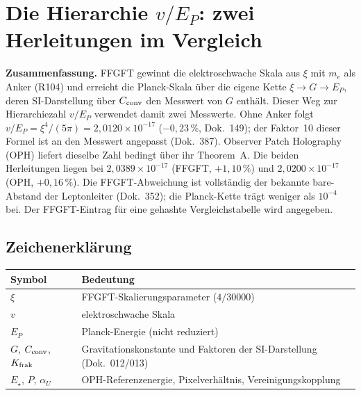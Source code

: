\providecommand{\BM}{\textbf{[B]}}
\providecommand{\KM}{\textbf{[K]}}
\providecommand{\SM}{\textbf{[S]}}
\providecommand{\XM}{\textbf{[X]}}
\providecommand{\QM}{\textbf{[Q]}}

\chapter*{Die Hierarchie $v/E_P$: zwei Herleitungen im Vergleich}

{\small\noindent\textbf{Zusammenfassung.}\quad\ignorespaces
FFGFT gewinnt die elektroschwache Skala aus $\xi$ mit $m_e$ als Anker (R104)
und erreicht die Planck-Skala über die eigene Kette $\xi\to G\to E_P$, deren
SI-Darstellung über $C_{\rm conv}$ den Messwert von $G$ enthält. Dieser Weg
zur Hierarchiezahl $v/E_P$ verwendet damit zwei Messwerte. Ohne Anker folgt
$v/E_P=\xi^4/(5\pi)=2{,}0120\times10^{-17}$ ($-0{,}23\,\%$, Dok.~149); der
Faktor~10 dieser Formel ist an den Messwert angepasst (Dok.~387). Observer Patch Holography (OPH) liefert dieselbe Zahl bedingt über
ihr Theorem~A. Die beiden Herleitungen liegen bei $2{,}0389\times10^{-17}$
(FFGFT, $+1{,}10\,\%$) und $2{,}0200\times10^{-17}$ (OPH, $+0{,}16\,\%$). Die
FFGFT-Abweichung ist vollständig der bekannte bare-Abstand der Leptonleiter
(Dok.~352); die Planck-Kette trägt weniger als $10^{-4}$ bei. Der
FFGFT-Eintrag für eine gehashte Vergleichstabelle wird angegeben.
}\medskip

\section*{Zeichenerklärung}

\medskip


\medskip
\begin{tabular}{@{}lp{10cm}@{}}
\toprule
\textbf{Symbol} & \textbf{Bedeutung} \\
\midrule
$\xi$ & FFGFT-Skalierungsparameter ($4/30000$) \\
$v$ & elektroschwache Skala \\
$E_P$ & Planck-Energie (nicht reduziert) \\
$G$, $C_{\rm conv}$, $K_{\rm frak}$ & Gravitationskonstante und Faktoren der SI-Darstellung (Dok.~012/013) \\
$E_\star$, $P$, $\alpha_U$ & OPH-Referenzenergie, Pixelverhältnis, Vereinigungskopplung \\
\bottomrule
\end{tabular}

